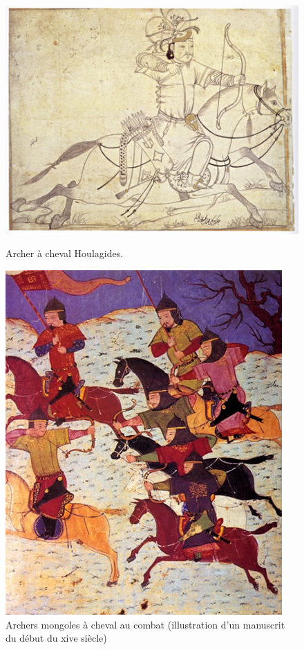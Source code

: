 \documentclass{article}
\begin{document}
\begin{center}
\begin{figure}[H]
\hfill
\begin{minipage}[H]{0.45\linewidth}
	\centering
	\includegraphics[width=\linewidth]{../ressources/IlkhanidHorseArcher}
	\caption{Archer à cheval Houlagides. \cite{archery}}
\end{minipage}
\hfill
\begin{minipage}[H]{0.4\linewidth}
	\centering
	\includegraphics[width=\linewidth]{../ressources/MongolCavalrymen}
	\caption{Archers mongoles à cheval au combat (illustration d'un manuscrit du début du xive siècle) \cite{mongol_army}}
\end{minipage}
\hfill
\end{figure}
\end{center}
\end{document}

